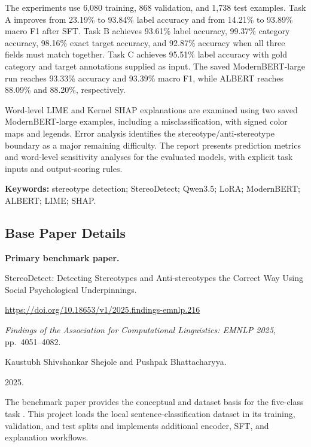 \documentclass[11pt,letterpaper]{article}
\begin{document}
The experiments use 6,080 training, 868 validation, and 1,738 test examples. Task A improves from 23.19\% to 93.84\% label accuracy and from 14.21\% to 93.89\% macro F1 after SFT. Task B achieves 93.61\% label accuracy, 99.37\% category accuracy, 98.16\% exact target accuracy, and 92.87\% accuracy when all three fields must match together. Task C achieves 95.51\% label accuracy with gold category and target annotations supplied as input. The saved ModernBERT-large run reaches 93.33\% accuracy and 93.39\% macro F1, while ALBERT reaches 88.09\% and 88.20\%, respectively.

Word-level LIME and Kernel SHAP explanations are examined using two saved ModernBERT-large examples, including a misclassification, with signed color maps and legends. Error analysis identifies the stereotype/anti-stereotype boundary as a major remaining difficulty. The report presents prediction metrics and word-level sensitivity analyses for the evaluated models, with explicit task inputs and output-scoring rules.

\textbf{Keywords:} stereotype detection; StereoDetect; Qwen3.5; LoRA; ModernBERT; ALBERT; LIME; SHAP.

\subsection*{Base Paper Details}
\textbf{Primary benchmark paper.}
\begin{description}[style=nextline,leftmargin=0pt]
\item[Title:] StereoDetect: Detecting Stereotypes and Anti-stereotypes the Correct Way Using Social Psychological Underpinnings.
\item[DOI:] \url{https://doi.org/10.18653/v1/2025.findings-emnlp.216}
\item[Conference / publication:] \textit{Findings of the Association for Computational Linguistics: EMNLP 2025}, pp.\ 4051--4082.
\item[Authors:] Kaustubh Shivshankar Shejole and Pushpak Bhattacharyya.
\item[Year:] 2025.
\end{description}
The benchmark paper provides the conceptual and dataset basis for the five-class task \citep{shejole2025}. This project loads the local sentence-classification dataset in its training, validation, and test splits and implements additional encoder, SFT, and explanation workflows.
\end{document}
